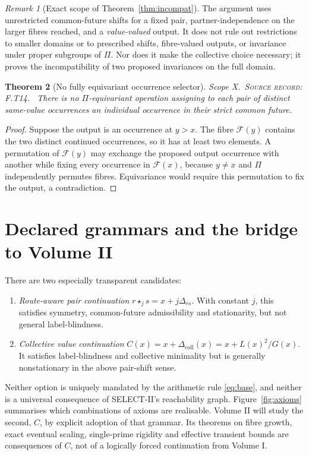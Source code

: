 \documentclass[11pt,oneside,openany]{book}
\newtheorem{theorem}{Theorem}[chapter]
\theoremstyle{definition}
\theoremstyle{remark}
\newtheorem{remark}[theorem]{Remark}
\newcommand{\Fx}{\mathcal{F}}
\newcommand{\scope}[1]{\textsf{\small Scope #1.}\ }
\newcommand{\record}[1]{\textup{\textsc{Source record: #1.}}\ }
\newcommand{\Del}{\Delta}
\begin{document}
\begin{remark}[Exact scope of Theorem~\ref{thm:incompat}]
The argument uses unrestricted common-future shifts for a fixed pair, partner-independence on the larger fibres reached, and a \emph{value-valued} output. It does not rule out restrictions to smaller domains or to prescribed shifts, fibre-valued outputs, or invariance under proper subgroups of \(\Pi\). Nor does it make the collective choice necessary; it proves the incompatibility of two proposed invariances on the full domain.
\end{remark}

\begin{theorem}[No fully equivariant occurrence selector]\label{thm:noselector}
\scope{X}\record{F.T14} There is no \(\Pi\)-equivariant operation assigning to each pair of distinct same-value occurrences an individual occurrence in their strict common future.
\end{theorem}
\begin{proof}
Suppose the output is an occurrence at \(y>x\). The fibre \(\Fx(y)\) contains the two distinct continued occurrences, so it has at least two elements. A permutation of \(\Fx(y)\) may exchange the proposed output occurrence with another while fixing every occurrence in \(\Fx(x)\), because \(y\ne x\) and \(\Pi\) independently permutes fibres. Equivariance would require this permutation to fix the output, a contradiction.
\end{proof}

\section{Declared grammars and the bridge to Volume II}\label{sec:declared}
There are two especially transparent candidates:
\begin{enumerate}[label=(\roman*)]
\item \emph{Route-aware pair continuation} \(r\star_j s=x+j\Del_{rs}\). With constant \(j\), this satisfies symmetry, common-future admissibility and stationarity, but not general label-blindness.
\item \emph{Collective value continuation} \(C(x)=x+\Del_{\mathrm{coll}}(x)=x+L(x)^2/G(x)\). It satisfies label-blindness and collective minimality but is generally nonstationary in the above pair-shift sense.
\end{enumerate}
Neither option is uniquely mandated by the arithmetic rule \eqref{eq:base}, and neither is a universal consequence of SELECT-II's reachability graph. Figure~\ref{fig:axioms} summarises which combinations of axioms are realisable. Volume II will study the second, \(C\), by explicit adoption of that grammar. Its theorems on fibre growth, exact eventual scaling, single-prime rigidity and effective transient bounds are consequences of \(C\), not of a logically forced continuation from Volume I.
\end{document}
